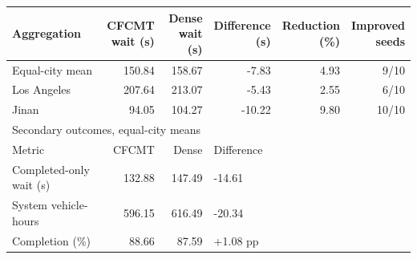 \begin{tabular}{lrrrrr}
\toprule
Aggregation & \shortstack{CFCMT\\wait (s)} & \shortstack{Dense\\wait (s)} & \shortstack{Difference\\(s)} & \shortstack{Reduction\\(\%)} & \shortstack{Improved\\seeds} \\
\midrule
Equal-city mean & 150.84 & 158.67 & -7.83 & 4.93 & 9/10 \\
Los Angeles & 207.64 & 213.07 & -5.43 & 2.55 & 6/10 \\
Jinan & 94.05 & 104.27 & -10.22 & 9.80 & 10/10 \\
\midrule
\multicolumn{6}{l}{Secondary outcomes, equal-city means} \\
Metric & CFCMT & Dense & \multicolumn{3}{l}{Difference} \\
Completed-only wait (s) & 132.88 & 147.49 & \multicolumn{3}{l}{-14.61} \\
System vehicle-hours & 596.15 & 616.49 & \multicolumn{3}{l}{-20.34} \\
Completion (\%) & 88.66 & 87.59 & \multicolumn{3}{l}{+1.08 pp} \\
\bottomrule
\end{tabular}
